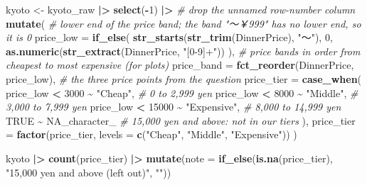 \documentclass[
]{article}
\newenvironment{Shaded}{\begin{snugshade}}{\end{snugshade}}
\newcommand{\AttributeTok}[1]{\textcolor[rgb]{0.13,0.29,0.53}{#1}}
\newcommand{\CommentTok}[1]{\textcolor[rgb]{0.56,0.35,0.01}{\textit{#1}}}
\newcommand{\ConstantTok}[1]{\textcolor[rgb]{0.56,0.35,0.01}{#1}}
\newcommand{\DecValTok}[1]{\textcolor[rgb]{0.00,0.00,0.81}{#1}}
\newcommand{\FunctionTok}[1]{\textcolor[rgb]{0.13,0.29,0.53}{\textbf{#1}}}
\newcommand{\NormalTok}[1]{#1}
\newcommand{\OtherTok}[1]{\textcolor[rgb]{0.56,0.35,0.01}{#1}}
\newcommand{\SpecialCharTok}[1]{\textcolor[rgb]{0.81,0.36,0.00}{\textbf{#1}}}
\newcommand{\StringTok}[1]{\textcolor[rgb]{0.31,0.60,0.02}{#1}}
\begin{document}
\begin{Shaded}
\begin{Highlighting}[]
\NormalTok{kyoto }\OtherTok{\textless{}{-}}\NormalTok{ kyoto\_raw }\SpecialCharTok{|\textgreater{}}
  \FunctionTok{select}\NormalTok{(}\SpecialCharTok{{-}}\DecValTok{1}\NormalTok{) }\SpecialCharTok{|\textgreater{}}                                   \CommentTok{\# drop the unnamed row{-}number column}
  \FunctionTok{mutate}\NormalTok{(}
    \CommentTok{\# lower end of the price band; the band "～￥999" has no lower end, so it is 0}
    \AttributeTok{price\_low =} \FunctionTok{if\_else}\NormalTok{(}
      \FunctionTok{str\_starts}\NormalTok{(}\FunctionTok{str\_trim}\NormalTok{(DinnerPrice), }\StringTok{"～"}\NormalTok{),}
      \DecValTok{0}\NormalTok{,}
      \FunctionTok{as.numeric}\NormalTok{(}\FunctionTok{str\_extract}\NormalTok{(DinnerPrice, }\StringTok{"[0{-}9]+"}\NormalTok{))}
\NormalTok{    ),}
    \CommentTok{\# price bands in order from cheapest to most expensive (for plots)}
    \AttributeTok{price\_band =} \FunctionTok{fct\_reorder}\NormalTok{(DinnerPrice, price\_low),}
    \CommentTok{\# the three price points from the question}
    \AttributeTok{price\_tier =} \FunctionTok{case\_when}\NormalTok{(}
\NormalTok{      price\_low }\SpecialCharTok{\textless{}} \DecValTok{3000}  \SpecialCharTok{\textasciitilde{}} \StringTok{"Cheap"}\NormalTok{,      }\CommentTok{\# 0 to 2,999 yen}
\NormalTok{      price\_low }\SpecialCharTok{\textless{}} \DecValTok{8000}  \SpecialCharTok{\textasciitilde{}} \StringTok{"Middle"}\NormalTok{,     }\CommentTok{\# 3,000 to 7,999 yen}
\NormalTok{      price\_low }\SpecialCharTok{\textless{}} \DecValTok{15000} \SpecialCharTok{\textasciitilde{}} \StringTok{"Expensive"}\NormalTok{,  }\CommentTok{\# 8,000 to 14,999 yen}
      \ConstantTok{TRUE}              \SpecialCharTok{\textasciitilde{}} \ConstantTok{NA\_character\_} \CommentTok{\# 15,000 yen and above: not in our tiers}
\NormalTok{    ),}
    \AttributeTok{price\_tier =} \FunctionTok{factor}\NormalTok{(price\_tier, }\AttributeTok{levels =} \FunctionTok{c}\NormalTok{(}\StringTok{"Cheap"}\NormalTok{, }\StringTok{"Middle"}\NormalTok{, }\StringTok{"Expensive"}\NormalTok{))}
\NormalTok{  )}

\NormalTok{kyoto }\SpecialCharTok{|\textgreater{}}
  \FunctionTok{count}\NormalTok{(price\_tier) }\SpecialCharTok{|\textgreater{}}
  \FunctionTok{mutate}\NormalTok{(}\AttributeTok{note =} \FunctionTok{if\_else}\NormalTok{(}\FunctionTok{is.na}\NormalTok{(price\_tier), }\StringTok{"15,000 yen and above (left out)"}\NormalTok{, }\StringTok{""}\NormalTok{))}
\end{Highlighting}
\end{Shaded}
\end{document}
